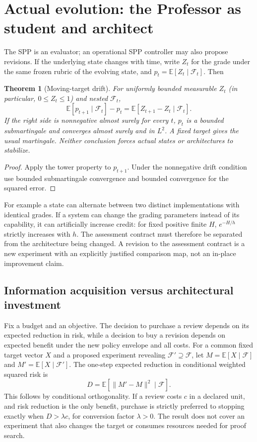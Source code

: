 \documentclass[11pt]{article}
\newtheorem{theorem}{Theorem}[section]\newtheorem{proposition}[theorem]{Proposition}\newtheorem{corollary}[theorem]{Corollary}\newtheorem{definition}[theorem]{Definition}\newtheorem{example}[theorem]{Example}\newtheorem{conjecture}[theorem]{Conjecture}
\newcommand{\E}{\mathbb E}\newcommand{\Prob}{\mathbb P}\newcommand{\F}{\mathcal F}\newcommand{\N}{\mathbb N}\newcommand{\Var}{\operatorname{Var}}\newcommand{\one}{\mathbf 1}\newcommand{\spp}{\mathrm{SPP}}
\begin{document}
\section{Actual evolution: the Professor as student and architect}
The SPP is an evaluator; an operational SPP controller may also propose revisions. If the underlying state changes with time, write $Z_t$ for the grade under the same frozen rubric of the evolving state, and $p_t=\E[Z_t\mid\F_t]$. Then
\begin{theorem}[Moving-target drift]\label{thm:drift}
For uniformly bounded measurable $Z_t$ (in particular, $0\leq Z_t\leq1$) and nested $\F_t$,
\[\E[p_{t+1}\mid\F_t]-p_t=\E[Z_{t+1}-Z_t\mid\F_t].\]
If the right side is nonnegative almost surely for every $t$, $p_t$ is a bounded submartingale and converges almost surely and in $L^2$. A fixed target gives the usual martingale. Neither conclusion forces actual states or architectures to stabilize.
\end{theorem}
\begin{proof}Apply the tower property to $p_{t+1}$. Under the nonnegative drift condition use bounded submartingale convergence and bounded convergence for the squared error.\end{proof}
For example a state can alternate between two distinct implementations with identical grades. If a system can change the grading parameters instead of its capability, it can artificially increase credit: for fixed positive finite $H$, $e^{-H/h}$ strictly increases with $h$. The assessment contract must therefore be separated from the architecture being changed. A revision to the assessment contract is a new experiment with an explicitly justified comparison map, not an in-place improvement claim.

\subsection{Information acquisition versus architectural investment}
Fix a budget and an objective. The decision to purchase a review depends on its expected reduction in risk, while a decision to buy a revision depends on expected benefit under the new policy envelope and all costs. For a common fixed target vector $X$ and a proposed experiment revealing $\F'\supseteq\F$, let $M=\E[X\mid\F]$ and $M'=\E[X\mid\F']$. The one-step expected reduction in conditional weighted squared risk is
\[D=\E[\|M'-M\|^2\mid\F].\]
This follows by conditional orthogonality. If a review costs $c$ in a declared unit, and risk reduction is the only benefit, purchase is strictly preferred to stopping exactly when $D>\lambda c$, for conversion factor $\lambda>0$. The result does not cover an experiment that also changes the target or consumes resources needed for proof search.
\end{document}
